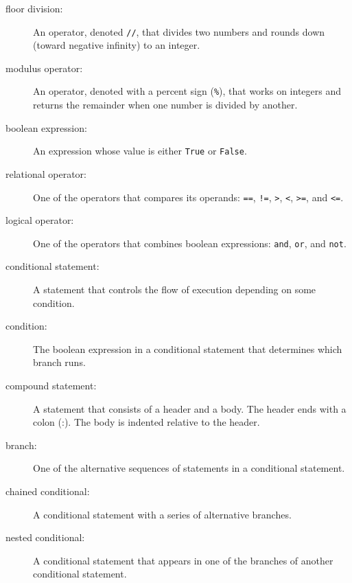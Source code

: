\documentclass[10pt]{book}
\begin{document}
\begin{description}

\item[floor division:] An operator, denoted {\tt //}, that divides two
  numbers and rounds down (toward negative infinity) to an integer.

\item[modulus operator:]  An operator, denoted with a percent sign
({\tt \%}), that works on integers and returns the remainder when one
number is divided by another.

\item[boolean expression:]  An expression whose value is either
{\tt True} or {\tt False}.

\item[relational operator:] One of the operators that compares
its operands: {\tt ==}, {\tt !=}, {\tt >}, {\tt <}, {\tt >=}, and {\tt <=}.

\item[logical operator:] One of the operators that combines boolean
expressions: {\tt and}, {\tt or}, and {\tt not}.

\item[conditional statement:]  A statement that controls the flow of
execution depending on some condition.

\item[condition:] The boolean expression in a conditional statement
that determines which branch runs.

\item[compound statement:]  A statement that consists of a header
and a body.  The header ends with a colon (:).  The body is indented
relative to the header.

\item[branch:] One of the alternative sequences of statements in
a conditional statement.

\item[chained conditional:]  A conditional statement with a series
of alternative branches.

\item[nested conditional:]  A conditional statement that appears
in one of the branches of another conditional statement.


\end{description}
\end{document}
